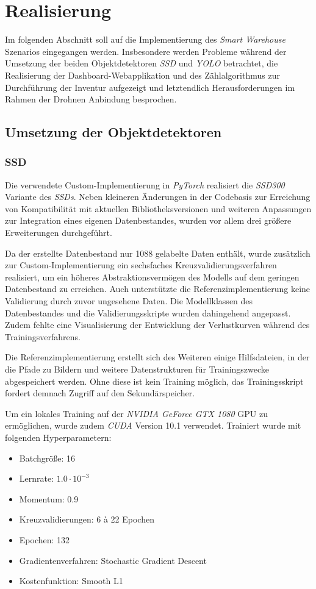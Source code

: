 \chapter{Realisierung}

Im folgenden Abschnitt soll auf die Implementierung des \textit{Smart Warehouse} Szenarios eingegangen werden. Insbesondere werden Probleme während der Umsetzung der beiden Objektdetektoren \textit{SSD} und \textit{YOLO} betrachtet, die Realisierung der Dashboard-Webapplikation und des Zählalgorithmus zur Durchführung der Inventur aufgezeigt und letztendlich Herausforderungen im Rahmen der Drohnen Anbindung besprochen.

\section{Umsetzung der Objektdetektoren}

\subsection*{SSD}

Die verwendete Custom-Implementierung in \textit{PyTorch} realisiert die \textit{SSD300} Variante des \textit{SSDs}. Neben kleineren Änderungen in der Codebasis zur Erreichung von Kompatibilität mit aktuellen Bibliotheksversionen und weiteren Anpassungen zur Integration eines eigenen Datenbestandes, wurden vor allem drei größere Erweiterungen durchgeführt. 

Da der erstellte Datenbestand nur 1088 gelabelte Daten enthält, wurde zusätzlich zur Custom-Implementierung ein sechsfaches Kreuzvalidierungsverfahren realisiert, um ein höheres Abstraktionsvermögen des Modells auf dem geringen Datenbestand zu erreichen. Auch unterstützte die Referenzimplementierung keine Validierung durch zuvor ungesehene Daten. Die Modellklassen des Datenbestandes und die Validierungsskripte wurden dahingehend angepasst. Zudem fehlte eine Visualisierung der Entwicklung der Verlustkurven während des Trainingsverfahrens.

Die Referenzimplementierung erstellt sich des Weiteren einige Hilfsdateien, in der die Pfade zu Bildern und weitere Datenstrukturen für Trainingszwecke abgespeichert werden. Ohne diese ist kein Training möglich, das Trainingsskript fordert demnach Zugriff auf den Sekundärspeicher. 

Um ein lokales Training auf der \textit{NVIDIA GeForce GTX 1080} GPU zu ermöglichen, wurde zudem \textit{CUDA} Version 10.1 verwendet. Trainiert wurde mit folgenden Hyperparametern:
\begin{itemize}
	\item Batchgröße: 16
	\item Lernrate: $1.0\cdot 10^{-3}$
	\item Momentum: 0.9
	\item Kreuzvalidierungen: 6 à 22 Epochen
	\item Epochen: 132
	\item Gradientenverfahren: Stochastic Gradient Descent
	\item Kostenfunktion: Smooth L1
\end{itemize}

